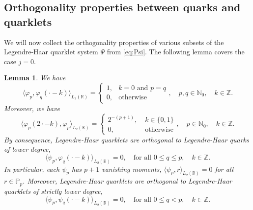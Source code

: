 \documentclass{article}
\newtheorem{lemma}[propo]{Lemma}
\begin{document}
\subsection{Orthogonality properties between quarks and quarklets}
We will now collect the orthogonality properties of various subsets of the Legendre-Haar quarklet system $\Psi$ from \eqref{eq:Psi}. The following lemma covers the case $j=0$.
\begin{lemma}\label{ortholemma}
We have
\begin{equation}
  \label{eq:phipphiqorth}
  \big\langle\varphi_p,\varphi_q(\cdot-k)\big\rangle_{L_2(\mathds R)}=\begin{cases}
  1,&k=0\text{ and }p=q\\
  0,&\text{otherwise}
  \end{cases},\quad
  p,q\in\mathbb N_0,\quad k\in\mathbb Z.
\end{equation}
Moreover, we have
\begin{equation}
  \label{eq:phipproducts}
  \big\langle\varphi_p(2\cdot-k),\varphi_p\big\rangle_{L_2(\mathbb R)}
  =
  \begin{cases}
  2^{-(p+1)},&\;k\in\{0,1\}\\
  0,&\;\text{otherwise}
  \end{cases},
  \quad
  p\in\mathbb N_0,\quad k\in\mathbb Z.
\end{equation}
By consequence, Legendre-Haar quarklets are orthogonal to Legendre-Haar quarks of lower degree,
\begin{equation}
  \label{eq:psipphiqorth}
  \big\langle\psi_p,\varphi_q(\cdot-k)\big\rangle_{L_2(\mathbb R)}=0,
  \quad
  \text{for all } 0\le q\le p,\quad k\in\mathbb Z.
\end{equation}
In particular, each $\psi_p$ has $p+1$ vanishing moments,
$\langle\psi_p,r\rangle_{L_2(\mathbb R)}=0$ for all $r\in\mathbb P_p$.
Moreover, Legendre-Haar quarklets are orthogonal to Legendre-Haar quarklets of strictly lower degree,
\begin{equation}
  \label{eq:psippsiqorth}
  \big\langle\psi_p,\psi_q(\cdot-k)\big\rangle_{L_2(\mathbb R)}=0,
  \quad
  \text{for all } 0\le q<p,\quad k\in\mathbb Z.
\end{equation}
\end{lemma}
\end{document}
